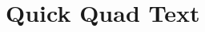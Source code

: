 \documentclass{article}
\begin{document}
                                          
                                     
                                           
                                           
                                           
                                            
                                            
                                            
                                            
                                        
                                        
                                        
                                        
                                             
                                         
                                         

\newpage
\section*{Quick Quad Text}
\end{document}
